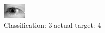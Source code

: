 \begin{figure}[h!]
\begin{center}
\includegraphics[width=0.60\columnwidth]{figures/ID3230_class_3_target_4.png}
\end{center}
\caption{ Classification: 3 actual target: 4}
\label{fig:ID3230_class_3_target_4}
\end{figure}
